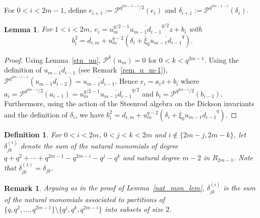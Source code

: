 \documentclass{amsart}
\newtheorem{lemma}[subsection]{Lemma}
\newtheorem{remark}[subsection]{Remark}
\newtheorem{definition}[subsection]{Definition}
\newcommand{\PP}{\mathcal{P}}
\begin{document}
For $0<i<2m-1$, define $e_{i+1}:=\PP^{q^{2m-1-i}/2}(e_i)$ and $\delta_{i+1}:=\PP^{q^{2m-1-i}}(\delta_i)$.

\begin{lemma} \label{ei-lem} For $1<i<2m$, $e_i=u_m^{q/2-1}\overline{u_{m-1}d_{i-1}}^{q/2}z+b_i$ with
$$b_i^2=d_{i,m}+u_m^{q-2}(\delta_i+\overline{\xi}_0\overline{u_{m-1}d_{i-1}}^q).$$
\end{lemma}
\begin{proof} Using Lemma~\ref{stn_un}, $\PP^k(u_m)=0$ for $0<k<q^{2m-1}$. 
Using the definition of $\overline{u_{m-1}d_{i-1}}$ (see Remark~\ref{rem_u_m-1}), $\PP^{q^{2m-i-1}}(\overline{u_{m-1}d_{i-2}})=\overline{u_{m-1}d_{i-1}}$.
Hence $e_i=a_iz+b_i$ where 
$a_i=\PP^{q^{2m-i}/2}(a_{i-1})=u_m^{q/2-1}\overline{u_{m-1}d_{i-1}}^{q/2}$ and $b_i=\PP^{q^{2m-i}/2}(b_{i-1})$.
 Furthermore,
using the action of the Steenrod algebra on the Dickson invariants and the definition of $\delta_i$, we have 
$b_i^2=d_{i,m}+u_m^{q-2}(\delta_i+\overline{\xi}_0\overline{u_{m-1}d_{i-1}}^q)$.
\end{proof}

\begin{definition} \label{delta_gen_def}For $0<i<2m$, $0<j<k<2m$ and $i\not\in\{2m-j,2m-k\}$, 
let $\delta_{jk}^{(i)}$ denote the sum of the natural monomials of
degree $q+q^2+\cdots +q^{2m-1}-q^{2m-i}-q^j-q^k$ and natural degree $m-2$
in $R_{2m-1}$.
Note that $\delta_{jk}^{(1)}=\delta_{jk}$.
\end{definition}

\begin{remark}\label{delta_gen_rem} Arguing as in the proof of Lemma~\ref{nat_mon_lem}, $\delta_{jk}^{(i)}$ is the sum of the natural monomials associated to partitions
of $\{q,q^2,\ldots,q^{2m-1}\}\setminus\{q^j,q^k,q^{2m-i}\}$ into subsets of size $2$. 
\end{remark}
\end{document}
